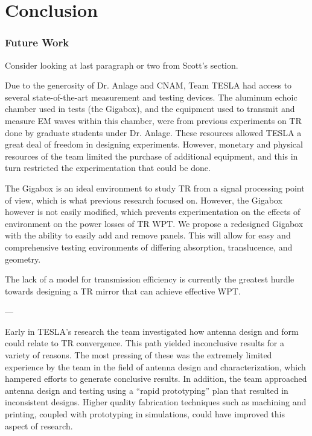 \chapter{Conclusion}

\label{ch:conclusion}


\subsection{Future Work}

Consider looking at last paragraph or two from Scott’s section.

Due to the generosity of Dr. Anlage and CNAM, Team TESLA had access to several state-of-the-art measurement and testing devices. The aluminum echoic chamber used in tests (the Gigabox), and the equipment used to transmit and measure EM waves within this chamber, were from previous experiments on TR done by graduate students under Dr. Anlage.  These resources allowed TESLA a great deal of freedom in designing experiments.  However, monetary and physical resources of the team limited the purchase of additional equipment, and this in turn restricted the experimentation that could be done.

The Gigabox is an ideal environment to study TR from a signal processing point of view, which is what previous research focused on. However, the Gigabox however is not easily modified, which prevents experimentation on the effects of environment on the power losses of TR WPT.  We propose a redesigned Gigabox with the ability to easily add and remove panels.  This will allow for easy and comprehensive testing environments of differing absorption, translucence, and geometry.

The lack of a model for transmission efficiency is currently the greatest hurdle towards designing a TR mirror that can achieve effective WPT.

---

Early in TESLA’s research the team investigated how antenna design and form could relate to TR convergence.  This path yielded inconclusive results for a variety of reasons. The most pressing of these was the extremely limited experience by the team in the field of antenna design and characterization, which hampered efforts to generate conclusive results.  In addition, the team approached antenna design and testing using a “rapid prototyping” plan that resulted in inconsistent designs.  Higher quality fabrication techniques such as machining and printing, coupled with prototyping in simulations, could have improved this aspect of research.

